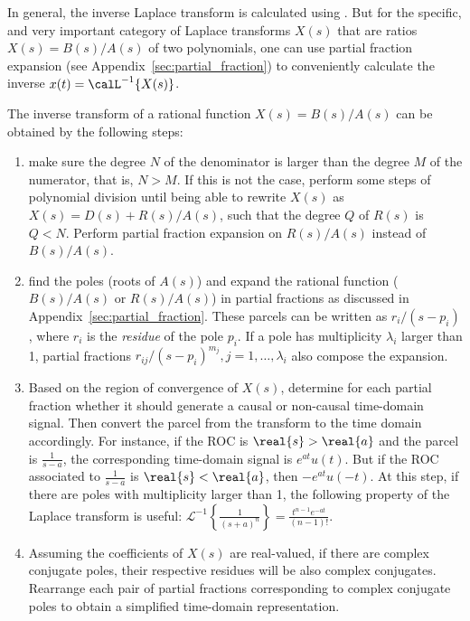 In general, the inverse Laplace transform is calculated using .
But for the specific, and very important category of Laplace transforms $X(s)$ that are ratios $X(s)=B(s)/A(s)$ of two polynomials,
one can use partial fraction expansion (see Appendix~\ref{sec:partial_fraction}) to conveniently calculate the inverse $x(t)=\calL^{-1} \{ X(s) \}$.

The inverse transform of a rational function $X(s)=B(s)/A(s)$ can be obtained by the following steps:
\begin{enumerate}
        \item make sure the degree $N$ of the denominator is larger than the degree $M$ of the numerator, that is, $N>M$. If this is not the case, perform some steps of polynomial division until being able to rewrite $X(s)$ as $X(s)=D(s) + R(s)/A(s)$, such that the degree $Q$ of $R(s)$ is $Q < N$. Perform partial fraction expansion on $R(s)/A(s)$ instead of $B(s)/A(s)$.
        \item find the poles (roots of $A(s)$) and expand the rational function ($B(s)/A(s)$ or $R(s)/A(s)$) in partial fractions 
				as discussed in Appendix~\ref{sec:partial_fraction}. These parcels can be written as $r_i/(s-p_i)$, where $r_i$ is the
				\emph{residue} of the pole $p_i$. If a pole has multiplicity $\lambda_i$ larger than 1, partial fractions $r_{ij}/(s-p_i)^{m_j}, j=1, \ldots, \lambda_i$ also compose the expansion.
				\item Based on the region of convergence of $X(s)$, determine for each partial fraction whether it should generate a causal
				or non-causal time-domain signal. Then convert the parcel from the transform to the time domain accordingly.
				For instance, if the ROC is $\real{s} > \real{a}$ and the parcel is
				$\frac{1}{s - a}$, the corresponding time-domain signal is $e^{at} u(t)$. But if the ROC associated to
				$\frac{1}{s - a}$ is $\real{s} < \real{a}$, then $-e^{at} u(-t)$.
				At this step, if there are poles with multiplicity larger than 1, the following property of the Laplace transform is useful:
				$\mathcal{L}^{-1}\left\{\frac{1}{(s+a)^n}\right\} = \frac{t^{n-1} e^{-at}}{(n-1)!}$.
        \item Assuming the coefficients of $X(s)$ are real-valued, if there are complex conjugate poles, their
				respective residues will be also complex conjugates. Rearrange each pair of partial fractions corresponding
				to complex conjugate poles to obtain a simplified time-domain representation.
\end{enumerate}


